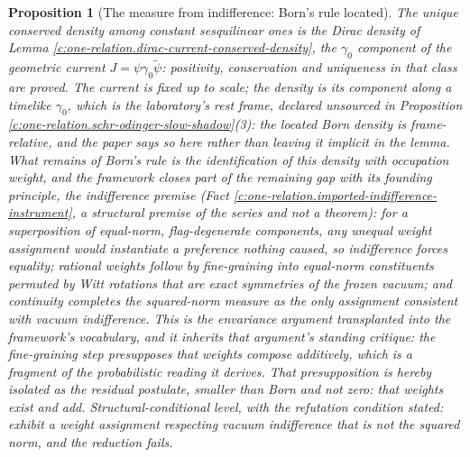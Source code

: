 \documentclass[11pt]{article}
\newtheorem{proposition}[theorem]{Proposition}
\theoremstyle{definition}
\theoremstyle{plain}
\begin{document}
\begin{proposition}[The measure from indifference: Born's rule located]\label{c:one-relation.measure-indifference-borns-rule-located}
The unique conserved density among constant sesquilinear ones is the Dirac density of Lemma \ref{c:one-relation.dirac-current-conserved-density}, the $\gamma_{0}$ component of the geometric current $J = \psi\gamma_{0}\tilde{\psi}$: positivity, conservation and uniqueness in that class are proved. The current is fixed up to scale; the \emph{density} is its component along a timelike $\gamma_{0}$, which is the laboratory's rest frame, declared unsourced in Proposition \ref{c:one-relation.schr-odinger-slow-shadow}(3): the located Born density is frame-relative, and the paper says so here rather than leaving it implicit in the lemma. What remains of Born's rule is the identification of this density with occupation weight, and the framework closes part of the remaining gap with its founding principle, the indifference premise (Fact \ref{c:one-relation.imported-indifference-instrument}, a structural premise of the series and not a theorem): for a superposition of equal-norm, flag-degenerate components, any unequal weight assignment would instantiate a preference nothing caused, so indifference forces equality; rational weights follow by fine-graining into equal-norm constituents permuted by Witt rotations that are exact symmetries of the frozen vacuum; and continuity completes the squared-norm measure as the only assignment consistent with vacuum indifference. This is the envariance argument \cite{Zurek2005} transplanted into the framework's vocabulary, and it inherits that argument's standing critique: the fine-graining step presupposes that weights compose additively, which is a fragment of the probabilistic reading it derives. That presupposition is hereby isolated as the residual postulate, smaller than Born and not zero: \emph{that weights exist and add}. Structural-conditional level, with the refutation condition stated: exhibit a weight assignment respecting vacuum indifference that is not the squared norm, and the reduction fails.
\end{proposition}
\end{document}
